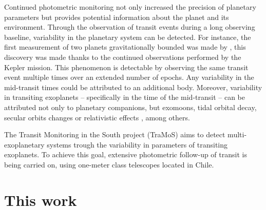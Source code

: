 Continued photometric monitoring not only increased the precision of planetary parameters but provides potential information about the planet and its environment. Through the observation of transit events during a long observing baseline, variability in the planetary system can be detected. For instance, the first measurement of two planets gravitationally bounded was made by \citep{Holman2010}, this discovery was made thanks to the continued observations performed by the Kepler mission. This phenomenon is detectable by observing the same transit event multiple times over an extended number of epochs. Any variability in the mid-transit times could be attributed to an additional body. Moreover, variability in transiting exoplanets -- specifically in the time of the mid-transit -- can be attributed not only to planetary companions, but exomoons\citep{Kipping2009a,Kipping2009b}, tidal orbital decay\citep{Hoyer2016,Hoyer2016b}, secular orbits changes\citep{Adams2006} or relativistic effects \citep{Heyl2007}, among others.

The Transit Monitoring in the South project (TraMoS) aims to detect multi-exoplanetary systems trough the variability in parameters of transiting exoplanets. To achieve this goal, extensive photometric follow-up of transit is being carried on, using one-meter class telescopes located in Chile.



\section{This work}


